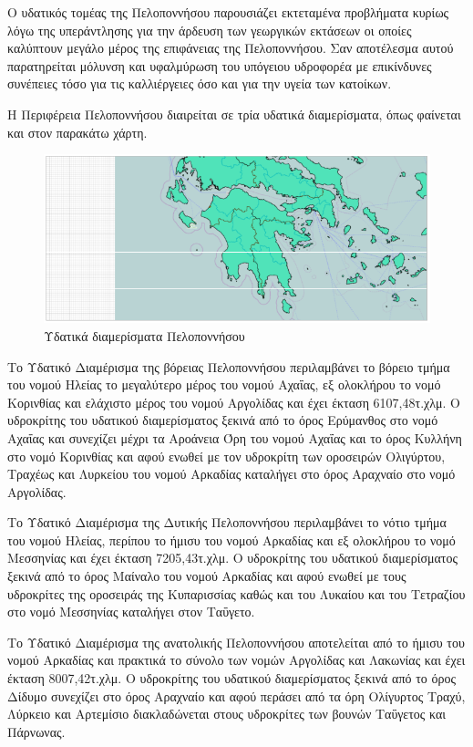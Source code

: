 \documentclass[12pt]{article}
\begin{document}
	Ο υδατικός τομέας της Πελοποννήσου παρουσιάζει εκτεταμένα προβλήματα κυρίως λόγω της υπεράντλησης για την άρδευση των γεωργικών εκτάσεων οι οποίες καλύπτουν μεγάλο μέρος της επιφάνειας της Πελοποννήσου. Σαν αποτέλεσμα αυτού παρατηρείται μόλυνση και υφαλμύρωση του υπόγειου υδροφορέα με επικίνδυνες συνέπειες τόσο για τις καλλιέργειες όσο και για την υγεία των κατοίκων.
	
	Η Περιφέρεια Πελοποννήσου διαιρείται σε τρία υδατικά διαμερίσματα, όπως φαίνεται και στον παρακάτω χάρτη.
	
	\begin{figure} [H]
		\begin{center}
			\includegraphics [scale = 0.75] {ydatika.png}
			\caption{Υδατικά διαμερίσματα Πελοποννήσου}
			\label{ydatika}
		\end{center}
	\end{figure}

	Το Υδατικό Διαμέρισμα της βόρειας Πελοποννήσου περιλαμβάνει το βόρειο τμήμα του νομού Ηλείας το μεγαλύτερο μέρος του νομού Αχαΐας, εξ ολοκλήρου το νομό Κορινθίας και ελάχιστο μέρος του νομού Αργολίδας και έχει έκταση 6107,48τ.χλμ. Ο υδροκρίτης του υδατικού διαμερίσματος ξεκινά από το όρος Ερύμανθος στο νομό Αχαΐας και συνεχίζει μέχρι τα Αροάνεια Όρη του νομού Αχαΐας και το όρος Κυλλήνη στο νομό Κορινθίας και αφού ενωθεί με τον υδροκρίτη των οροσειρών Ολιγύρτου, Τραχέως και Λυρκείου του νομού Αρκαδίας καταλήγει στο όρος Αραχναίο στο νομό Αργολίδας.
	
	Το Υδατικό Διαμέρισμα της Δυτικής Πελοποννήσου περιλαμβάνει το νότιο τμήμα του νομού Ηλείας, περίπου το ήμισυ του νομού Αρκαδίας και εξ ολοκλήρου το νομό Μεσσηνίας και έχει έκταση 7205,43τ.χλμ. Ο υδροκρίτης του υδατικού διαμερίσματος ξεκινά από το όρος Μαίναλο του νομού Αρκαδίας και αφού ενωθεί με τους υδροκρίτες της οροσειράς της Κυπαρισσίας καθώς και του Λυκαίου και του Τετραζίου στο νομό Μεσσηνίας καταλήγει στον Ταΰγετο.
	
	Το Υδατικό Διαμέρισμα της ανατολικής Πελοποννήσου αποτελείται από το ήμισυ του νομού Αρκαδίας και πρακτικά το σύνολο των νομών Αργολίδας και Λακωνίας και έχει έκταση 8007,42τ.χλμ. Ο υδροκρίτης του υδατικού διαμερίσματος ξεκινά από το όρος Δίδυμο συνεχίζει στο όρος Αραχναίο και αφού περάσει από τα όρη Ολίγυρτος Τραχύ, Λύρκειο και Αρτεμίσιο διακλαδώνεται στους υδροκρίτες των βουνών Ταΰγετος και Πάρνωνας.
	
\end{document}
